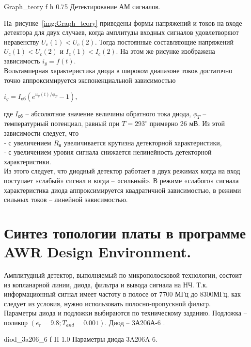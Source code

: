 \documentclass{bmstu}
\begin{document}
		{Graph_teory}
		{f} %
		{h} %
		{0.75\textwidth} %
		{Детектирование АМ сигналов.} %
	
\indent	На~рисунке~\ref{img:Graph_teory} приведены 
	формы
	напряжений и токов на входе детектора для двух случаев, когда амплитуды входных
	сигналов удовлетворяют неравенству $U_c(1) < U_c(2)$. Тогда постоянные 
	составляющие напряжений $U_c(1) < U_c(2)$ и $I_c(1) < I_c(2)$. На этом же 
	рисунке изображена зависимость $i_g = f(t)$. \\
\indent	Вольтамперная характеристика диода в широком диапазоне токов достаточно 
	точно аппроксимируется экспоненциальной зависимостью
	\begin{center}
		$i_g = I_\text{об} (e^{u_g(t)/\phi_T} - 1),$
	\end{center}

\indent где $I_\text{об}$ – абсолютное значение величины обратного тока диода,
	$\phi_T$ – температурный потенциал, равный при $T = 293^{\circ}$ примерно 26
	мВ. Из этой зависимости следует, что \\
\indent	‐ с увеличением $R_\text{н}$ увеличивается крутизна детекторной
	характеристики, \\
\indent	‐ с увеличением уровня сигнала снижается нелинейность детекторной 
	характеристики. \\
\indent	Из этого следует, что диодный детектор работает в двух режимах когда на вход
	поступает «слабый» сигнал и когда – «сильный». В режиме «слабого» сигнала
	характеристика диода аппроксимируется квадратичной зависимостью, в режими 
	сильных токов – линейной зависимостью.
	
	
	\chapter{Синтез топологии платы в программе AWR Design Environment.}
	
	Амплитудный детектор, выполняемый по микрополосковой технологии, состоит из 
	копланарной линии, диода, фильтра и вывода сигнала на НЧ. Т.к. информационный 
	сигнал имеет частоту в полосе от 7700 МГц до 8300МГц, как следует из условия, 
	нужно использовать полосно‐пропускной фильтр. \\
\indent	Параметры диода и подложки выбираются по техническому заданию. Подложка – 
	поликор $(e_r = 9.8; T_{and} = 0.001)$. Диод – 3А206А-6 \cite{9}.
	
	{diod_3a206_6}
	{f} %
	{H} %
	{1.0\textwidth} %
	{Параметры диода 3A206A-6.} %
	
\end{document}
